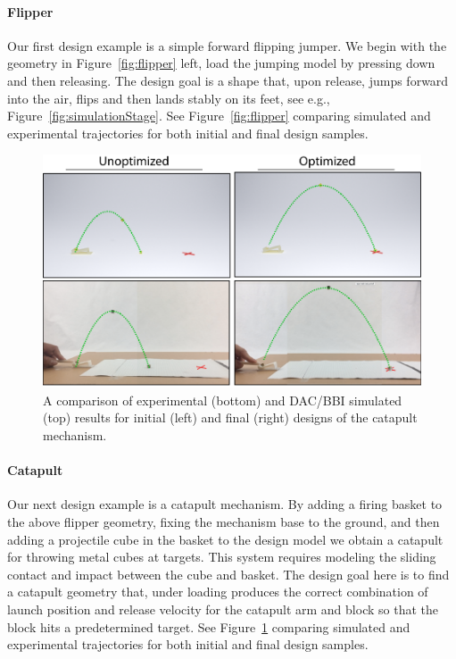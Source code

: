 \paragraph{Flipper}
Our first design example is a simple forward flipping jumper. We begin with the geometry in Figure~\ref{fig:flipper} left, load the jumping model by pressing down and then releasing. The design goal is a shape that, upon release, jumps forward into the air, flips and then lands stably on its feet, see e.g., Figure~\ref{fig:simulationStage}. 
See Figure~\ref{fig:flipper} comparing simulated and experimental trajectories for both initial and final design samples.

\begin{figure}[h!]
	\centering
\includegraphics[width=0.7\columnwidth]{./images/ResultsCatapult.png}
\caption{A comparison of experimental (bottom) and DAC/BBI simulated (top) results for initial (left) and final (right) designs of the catapult mechanism.}
\label{fig:catapult}	
\end{figure}

\paragraph{Catapult}
Our next design example is a catapult mechanism. By adding a firing basket to the above flipper geometry, fixing the mechanism base to the ground, and then adding a projectile cube in the basket to the design model we obtain a catapult for throwing metal cubes at targets. This system requires modeling the sliding contact and impact between the cube and basket. The design goal here is to find a catapult geometry that, under loading produces the correct combination of launch position and release velocity for the catapult arm and block so that the block hits a predetermined target. 
See Figure~\ref{fig:catapult} comparing simulated and experimental trajectories for both initial and final design samples.

